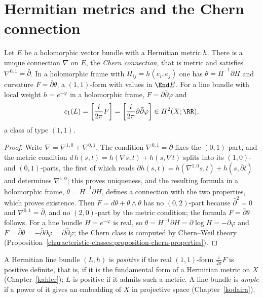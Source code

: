 \section{Hermitian metrics and the Chern connection}\label{complex-manifolds:section-chern-connection}

\begin{theorem}\label{complex-manifolds:theorem-chern-connection}
Let $E$ be a holomorphic vector bundle with a Hermitian metric $h$. There is a unique connection $\nabla$ on $E$, the \emph{Chern connection}, that is metric and satisfies $\nabla^{0,1} = \bar\partial$. In a
holomorphic frame with $H_{ij} = h(e_i, e_j)$ one has $\theta = \overline{H}^{-1}\partial\overline{H}$ and curvature $F = \bar\partial\theta$, a $(1,1)$-form with values in $\End E$. For a line bundle with local
weight $h = e^{-\varphi}$ in a holomorphic frame, $F = \partial\bar\partial\varphi$ and
\[
c_1(L) = \left[\frac{i}{2\pi}F\right] = \left[\frac{i}{2\pi}\partial\bar\partial\varphi\right] \in H^2(X; \RR),
\]
a class of type $(1,1)$.
\end{theorem}

\begin{proof}
Write $\nabla = \nabla^{1,0} + \nabla^{0,1}$. The condition $\nabla^{0,1} = \bar\partial$ fixes the $(0,1)$-part, and the metric condition
$d\,h(s, t) = h(\nabla s, t) + h(s, \nabla t)$ splits into its $(1,0)$- and $(0,1)$-parts, the first of which reads $\partial h(s, t) = h(\nabla^{1,0}s, t) + h(s, \bar\partial t)$ and determines $\nabla^{1,0}$; this
proves uniqueness, and the resulting formula in a holomorphic frame, $\theta = \overline{H}^{-1}\partial\overline{H}$, defines a connection with the two properties, which proves existence. Then
$F = d\theta + \theta \wedge \theta$ has no $(0,2)$-part because $\bar\partial^2 = 0$ and $\nabla^{0,1} = \bar\partial$, and no $(2,0)$-part by the metric condition; the formula $F = \bar\partial\theta$ follows. For a
line bundle $H = e^{-\varphi}$ is real, so $\theta = H^{-1}\partial H = \partial\log H = -\partial\varphi$ and $F = \bar\partial\theta = -\bar\partial\partial\varphi = \partial\bar\partial\varphi$; the Chern class is
computed by Chern--Weil theory (Proposition~\ref{characteristic-classes:proposition-chern-properties}).
\end{proof}

\begin{definition}\label{complex-manifolds:definition-positive}
A Hermitian line bundle $(L, h)$ is \emph{positive} if the real $(1,1)$-form $\frac{i}{2\pi}F$ is positive definite, that is, if it is the fundamental form of a Hermitian metric on $X$
(Chapter~\ref{kahler}); $L$ is positive if it admits such a metric. A line bundle is \emph{ample} if a power of it gives an embedding of $X$ in projective space
(Chapter~\ref{kodaira}).
\end{definition}

